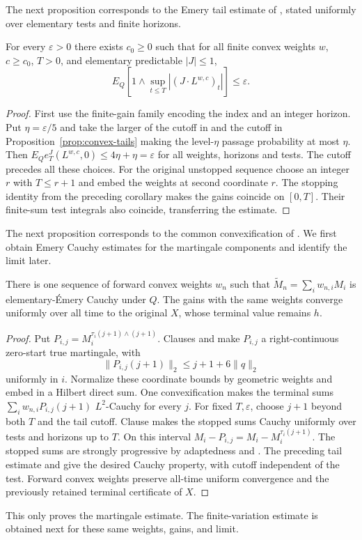 The next proposition corresponds to the Emery tail estimate of \cite[Lemma 4.9]{DS}, stated uniformly over elementary tests and finite horizons.

\begin{proposition}\label{prop:test-uniform-tails}
For every $\varepsilon>0$ there exists $c_0\geq0$ such that for all finite
convex weights $w$, $c\geq c_0$, $T>0$, and elementary predictable $|J|\leq1$,
\[
 E_Q\left[1\wedge\sup_{t\leq T}|(J\cdot L^{w,c})_t|\right]\leq\varepsilon.
\]
\end{proposition}
\begin{proof}
First use the finite-gain family encoding the index and an integer horizon.
Put $\eta=\varepsilon/5$ and take the larger of the cutoff in  and the cutoff in
Proposition~\ref{prop:convex-tails} making the level-$\eta$ passage probability at most $\eta$.
Then $E_Qe_T^J(L^{w,c},0)\leq4\eta+\eta=\varepsilon$ for all weights, horizons and tests.
The cutoff precedes all these choices.
For the original unstopped sequence choose an integer $r$ with $T\leq r+1$ and embed the weights at second coordinate $r$.
The stopping identity from the preceding corollary makes the gains coincide on $[0,T]$.
Their finite-sum test integrals also coincide, transferring the estimate.
\end{proof}
The next proposition corresponds to the common convexification of \cite[Lemma 4.10]{DS}. We first obtain Emery Cauchy estimates for the martingale components and identify the limit later.

\begin{proposition}\label{prop:martingale-convexification}
There is one sequence of forward convex weights $w_n$ such that
$\widetilde M_n=\sum_iw_{n,i}M_i$ is elementary-Émery Cauchy under $Q$.
The gains with the same weights converge uniformly over all time to the
original $X$, whose terminal value remains $h$.
\end{proposition}
\begin{proof}
Put $P_{i,j}=M_i^{\tau_i(j+1)\wedge(j+1)}$.
Clauses  and  make $P_{i,j}$ a right-continuous zero-start true martingale, with
\[
 \|P_{i,j}(j+1)\|_2\leq j+1+6\|q\|_2
\]
uniformly in $i$. Normalize these coordinate bounds by geometric weights
and embed in a Hilbert direct sum. One convexification makes the terminal
sums $\sum_iw_{n,i}P_{i,j}(j+1)$ $L^2$-Cauchy for every $j$.
For fixed $T,\varepsilon$, choose $j+1$ beyond both $T$ and the tail cutoff.
Clause  makes the stopped sums Cauchy uniformly over tests and horizons up to $T$.
On this interval
$M_i-P_{i,j}=M_i-M_i^{\tau_i(j+1)}$. The stopped sums are strongly progressive by adaptedness and .
The preceding tail estimate and  give the desired Cauchy property, with cutoff independent of the test.
Forward convex weights preserve all-time uniform convergence and the
previously retained terminal certificate of $X$.
\end{proof}
This only proves the martingale estimate. The finite-variation estimate is
obtained next for these same weights, gains, and limit.

